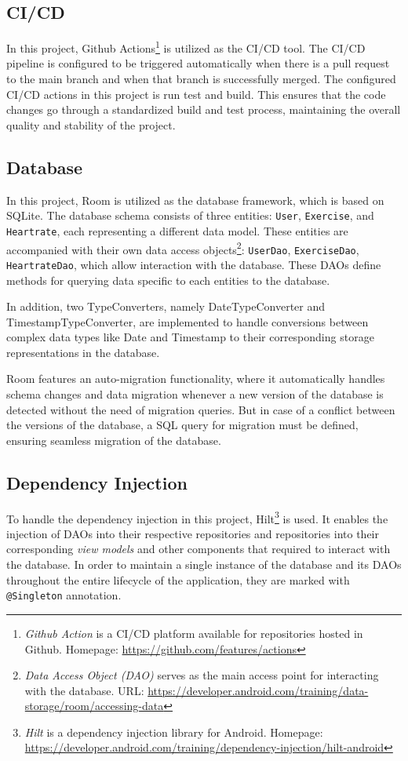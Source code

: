 \subsection{CI/CD}
In this project, Github Actions\footnote{\emph{Github Action} is a CI/CD platform available for repositories hosted in Github. Homepage: \url{https://github.com/features/actions}} is utilized as the CI/CD tool. 
The CI/CD pipeline is configured to be triggered automatically when there is a pull request to the main branch and when that branch is successfully merged. The configured CI/CD actions in this project is run test and build. 
This ensures that the code changes go through a standardized build and test process, maintaining the overall quality and stability of the project.

\subsection{Database}
In this project, Room is utilized as the database framework, which is based on SQLite.
The database schema consists of three entities: \texttt{User}, \texttt{Exercise}, and \texttt{Heartrate}, each representing a different data model.
These entities are accompanied with their own data access objects\footnote{\emph{Data Access Object (DAO)} serves as the main access point for interacting with the database. URL: \url{https://developer.android.com/training/data-storage/room/accessing-data}}: \texttt{UserDao}, \texttt{ExerciseDao}, \texttt{HeartrateDao}, which allow interaction with the database. These DAOs define methods for querying data specific to each entities to the database.

In addition, two TypeConverters, namely DateTypeConverter and TimestampTypeConverter, are implemented to handle conversions between complex data types like Date and Timestamp to their corresponding storage representations in the database.

Room features an auto-migration functionality, where it automatically handles schema changes and data migration whenever a new version of the database is detected without the need of migration queries.
But in case of a conflict between the versions of the database, a SQL query for migration must be defined, ensuring seamless migration of the database.

\subsection{Dependency Injection}
To handle the dependency injection in this project, Hilt\footnote{\emph{Hilt} is a dependency injection library for Android. Homepage: \url{https://developer.android.com/training/dependency-injection/hilt-android}} is used. 
It enables the injection of DAOs into their respective repositories and repositories into their corresponding \emph{view models} and other components that required to interact with the database. 
In order to maintain a single instance of the database and its DAOs throughout the entire lifecycle of the application, they are marked with \texttt{@Singleton} annotation. 

